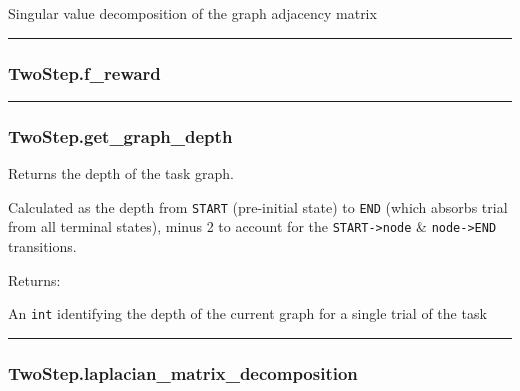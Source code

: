 Singular value decomposition of the graph adjacency matrix

\begin{center}\rule{0.5\linewidth}{\linethickness}\end{center}

\subsubsection{TwoStep.f\_reward}\label{twostep.f_reward}

\begin{Shaded}
\begin{Highlighting}[]
\end{Highlighting}
\end{Shaded}

\begin{center}\rule{0.5\linewidth}{\linethickness}\end{center}

\subsubsection{TwoStep.get\_graph\_depth}\label{twostep.get_graph_depth}

\begin{Shaded}
\begin{Highlighting}[]
\NormalTok{)}
\end{Highlighting}
\end{Shaded}

Returns the depth of the task graph.

Calculated as the depth from \texttt{START} (pre-initial state) to
\texttt{END} (which absorbs trial from all terminal states), minus 2 to
account for the \texttt{START-\textgreater{}node} \&
\texttt{node-\textgreater{}END} transitions.

Returns:

An \texttt{int} identifying the depth of the current graph for a single
trial of the task

\begin{center}\rule{0.5\linewidth}{\linethickness}\end{center}

\subsubsection{TwoStep.laplacian\_matrix\_decomposition}\label{twostep.laplacian_matrix_decomposition}

